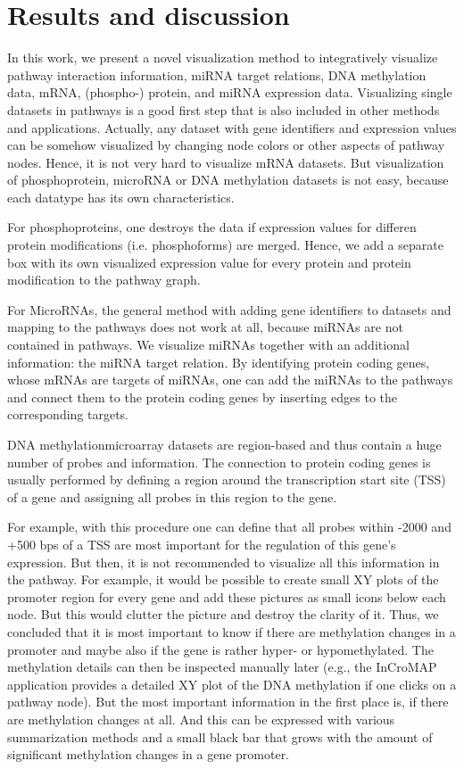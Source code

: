 \documentclass{bioinfo}
\begin{document}

\section{Results and discussion}

In this work, we present a novel visualization method to integratively visualize pathway interaction
information, miRNA target relations, DNA methylation data, mRNA, (phospho-) protein, and miRNA
expression data. Visualizing single datasets in pathways is a good first step that is also included
in other methods and applications. Actually, any dataset with gene identifiers and expression values
can be somehow visualized by changing node colors or other aspects of pathway nodes. Hence, it is
not very hard to visualize mRNA datasets. But visualization of phosphoprotein, microRNA or DNA
methylation datasets is not easy, because each datatype has its own characteristics.

For phosphoproteins, one destroys the data if expression values for differen protein modifications
(i.e. phosphoforms) are merged. Hence, we add a separate box with its own visualized expression
value for every protein and protein modification to the pathway graph.

For MicroRNAs, the general method with adding gene identifiers to datasets and mapping to the
pathways does not work at all, because miRNAs are not contained in pathways. We visualize miRNAs
together with an additional information: the miRNA target relation. By identifying protein coding
genes, whose mRNAs are targets of miRNAs, one can add the miRNAs to the pathways and connect them to
the protein coding genes by inserting edges to the corresponding targets.

DNA methylationmicroarray datasets are region-based and thus contain a huge number of probes and
information. The connection to protein coding genes is usually performed by defining a region around
the transcription start site (TSS) of a gene and assigning all probes in this region to the gene.

For example, with this procedure one can define that all probes within -2000 and +500 bps of a TSS
are most important for the regulation of this gene's expression.  But then, it is not recommended to
visualize all this information in the pathway. For example, it would be possible to create small XY
plots of the promoter region for every gene and add these pictures as small icons below each
node. But this would clutter the picture and destroy the clarity of it. Thus, we concluded that it
is most important to know if there are methylation changes in a promoter and maybe also if the gene
is rather hyper- or hypomethylated. The methylation details can then be inspected manually later
(e.g., the InCroMAP application provides a detailed XY plot of the DNA methylation if one clicks on
a pathway node). But the most important information in the first place is, if there are methylation
changes at all. And this can be expressed with various summarization methods and a small black bar
that grows with the amount of significant methylation changes in a gene promoter.
\end{document}
